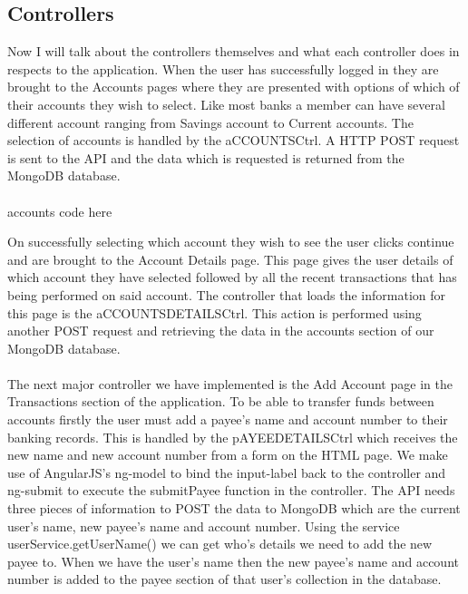 \subsection{Controllers}
Now I will talk about the controllers themselves and what each controller does in respects to the application. When the user has successfully logged in they are brought to the Accounts pages where they are presented with options of which of their accounts they wish to select. Like most banks a member can have several different account ranging from Savings account to Current accounts.  The selection of accounts is handled by the aCCOUNTSCtrl. A HTTP POST request is sent to the API and the data which is requested is returned from the MongoDB database.\paragraph{}
accounts code here

On successfully selecting which account they wish to see the user clicks continue and are brought to the Account Details page. This page gives the user details of which account they have selected followed by all the recent transactions that has being performed on said account. The controller that loads the information for this page is the aCCOUNTSDETAILSCtrl. This action is performed using another POST request and retrieving the data in the accounts section of our MongoDB database.\paragraph{}

The next major controller we have implemented is the Add Account page in the Transactions section of the application. To be able to transfer funds between accounts firstly the user must add a payee’s name and account number to their banking records. This is handled by the pAYEEDETAILSCtrl which receives the new name and new account number from a form on the HTML page. We make use of AngularJS’s ng-model to bind the input-label back to the controller and ng-submit to execute the submitPayee function in the controller. The API needs three pieces of information to POST the data to MongoDB which are the current user’s name, new payee’s name and account number. Using the service userService.getUserName() we can get who’s details we need to add the new payee to. When we have the user’s name then the new payee’s name and account number is added to the payee section of that user’s collection in the database.\paragraph{}


